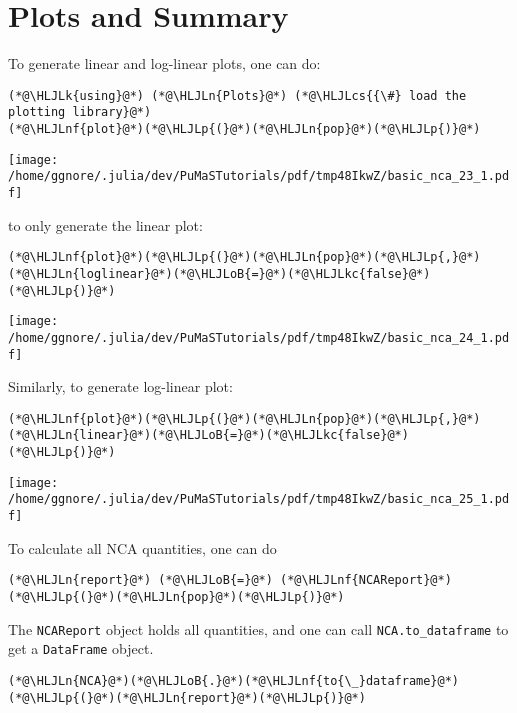 \documentclass[12pt,a4paper]{article}
\newcommand{\HLJLk}[1]{\textcolor[RGB]{148,91,176}{\textbf{#1}}}
\newcommand{\HLJLkc}[1]{\textcolor[RGB]{59,151,46}{\textit{#1}}}
\newcommand{\HLJLn}[1]{#1}
\newcommand{\HLJLnf}[1]{\textcolor[RGB]{66,102,213}{#1}}
\newcommand{\HLJLoB}[1]{\textcolor[RGB]{102,102,102}{\textbf{#1}}}
\newcommand{\HLJLp}[1]{#1}
\newcommand{\HLJLcs}[1]{\textcolor[RGB]{153,153,119}{\textit{#1}}}
\begin{document}
\section{Plots and Summary}
To generate linear and log-linear plots, one can do:


\begin{lstlisting}
(*@\HLJLk{using}@*) (*@\HLJLn{Plots}@*) (*@\HLJLcs{{\#} load the plotting library}@*)
(*@\HLJLnf{plot}@*)(*@\HLJLp{(}@*)(*@\HLJLn{pop}@*)(*@\HLJLp{)}@*)
\end{lstlisting}

\texttt{[image: /home/ggnore/.julia/dev/PuMaSTutorials/pdf/tmp48IkwZ/basic\_nca\_23\_1.pdf]}

to only generate the linear plot:


\begin{lstlisting}
(*@\HLJLnf{plot}@*)(*@\HLJLp{(}@*)(*@\HLJLn{pop}@*)(*@\HLJLp{,}@*) (*@\HLJLn{loglinear}@*)(*@\HLJLoB{=}@*)(*@\HLJLkc{false}@*)(*@\HLJLp{)}@*)
\end{lstlisting}

\texttt{[image: /home/ggnore/.julia/dev/PuMaSTutorials/pdf/tmp48IkwZ/basic\_nca\_24\_1.pdf]}

Similarly, to generate log-linear plot:


\begin{lstlisting}
(*@\HLJLnf{plot}@*)(*@\HLJLp{(}@*)(*@\HLJLn{pop}@*)(*@\HLJLp{,}@*) (*@\HLJLn{linear}@*)(*@\HLJLoB{=}@*)(*@\HLJLkc{false}@*)(*@\HLJLp{)}@*)
\end{lstlisting}

\texttt{[image: /home/ggnore/.julia/dev/PuMaSTutorials/pdf/tmp48IkwZ/basic\_nca\_25\_1.pdf]}

To calculate all NCA quantities, one can do


\begin{lstlisting}
(*@\HLJLn{report}@*) (*@\HLJLoB{=}@*) (*@\HLJLnf{NCAReport}@*)(*@\HLJLp{(}@*)(*@\HLJLn{pop}@*)(*@\HLJLp{)}@*)
\end{lstlisting}


The \texttt{NCAReport} object holds all quantities, and one can call \texttt{NCA.to\_dataframe} to get a \texttt{DataFrame} object.


\begin{lstlisting}
(*@\HLJLn{NCA}@*)(*@\HLJLoB{.}@*)(*@\HLJLnf{to{\_}dataframe}@*)(*@\HLJLp{(}@*)(*@\HLJLn{report}@*)(*@\HLJLp{)}@*)
\end{lstlisting}
\end{document}
